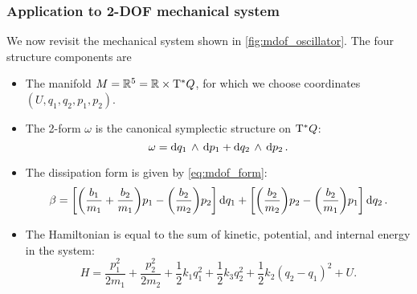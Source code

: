 \subsubsection{Application to 2-DOF mechanical system}
We now revisit the mechanical system shown in \cref{fig:mdof_oscillator}. The four structure components are
\begin{itemize}
    \item The manifold \(M = \mathbb{R}^5 = \mathbb{R} \times \mathrm{T}^*Q\), for which we choose coordinates \((U, q_1, q_2, p_1, p_2)\).
    \item The 2-form \(\omega\) is the canonical symplectic structure on \(\mathrm{T}^*Q\):
        \begin{equation}
     \omega =  \dd{q_1}\,\wedge\,\dd{p_1}  +  \dd{q_2}\,\wedge\,\dd{p_2} .
\end{equation}
    \item The dissipation form is given by \cref{eq:mdof_form}:
        \begin{equation}
     \beta =  \qty[\qty(\frac{b_1}{m_1} + \frac{b_2}{m_1}) p_1 - \qty(\frac{b_2}{m_2})p_2]\dd{q_1}
                          + \qty[\qty(\frac{b_2}{m_2})p_2 - \qty(\frac{b_2}{m_1})p_1]\dd{q_2}.
\end{equation}
    \item The Hamiltonian is equal to the sum of kinetic, potential, and internal energy in the system:
        \begin{equation}
     H = \frac{p^2_1}{2m_1} + \frac{p^2_2}{2m_2} + \frac{1}{2}k_1q_1^2 + \frac{1}{2}k_3q_2^2 + \frac{1}{2}k_2(q_2 - q_1)^2 + U.
\end{equation}
\end{itemize}

